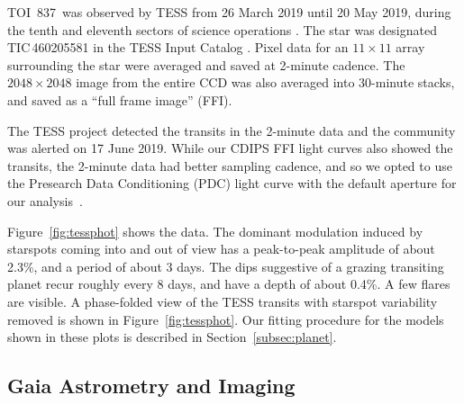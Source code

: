 \documentclass[12pt,twocolumn,tighten]{aastex63}
\newcommand{\tn}{TOI~837} %
\begin{document}
\tn\ was observed by TESS from 26 March 2019 until 20 May 2019, during
the tenth and eleventh sectors of science operations
\citep{ricker_transiting_2015}.  The star was designated
TIC\,460205581 in the TESS Input Catalog
\citep{stassun_TIC_2018,stassun_TIC8_2019}.  Pixel data for an
$11\times11$ array surrounding the star were averaged and saved at
2-minute cadence.  The $2048\times2048$ image from the entire CCD was
also averaged into 30-minute stacks, and saved as a ``full frame
image'' (FFI).

The TESS project detected the transits in the 2-minute data and the
community was alerted on 17 June 2019.  While our CDIPS FFI light
curves also showed the transits, the 2-minute data had better sampling
cadence, and so we opted to use the Presearch Data Conditioning (PDC)
light curve with the default aperture for our
analysis~\citep{smith_kepler_2012,stumpe_multiscale_2014,jenkins_tess_2016,smith_finding_2016}.

Figure~\ref{fig:tessphot} shows the data.  The dominant modulation
induced by starspots coming into and out of view has a peak-to-peak
amplitude of about 2.3\%, and a period of about 3 days.  The dips
suggestive of a grazing transiting planet recur roughly every 8 days,
and have a depth of about 0.4\%.  A few flares are visible.  A
phase-folded view of the TESS transits with starspot variability
removed is shown in Figure~\ref{fig:tessphot}. Our fitting procedure
for the models shown in these plots is described in
Section~\ref{subsec:planet}.


\subsection{Gaia Astrometry and Imaging}
\label{subsec:gaia}
\end{document}
